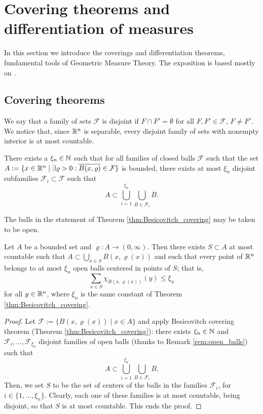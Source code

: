 \section{Covering theorems and differentiation of measures}

In this section we introduce the coverings and differentiation theorems, fundamental tools of Geometric Measure Theory. The exposition is based mostly on \cite[Chapter 2]{AFP}.

\subsection{Covering theorems}
We say that a family of sets $\mathcal{F}$ is disjoint if $F \cap F' = \emptyset$ for
all $F,F' \in \mathcal{F}$, $F \neq F'$.
We notice that, since $\mathbb{R}^{n}$ is separable, every disjoint family of sets with nonempty interior is at most countable.

\begin{theorem} \label{thm:Besicovitch_covering}
There exists a $\xi_n \in \mathbb{N}$ such that for all families of closed balls
$\mathcal{F}$ such that the set 
$A: = \{ x \in \mathbb{R}^n \mid \exists \varrho > 0 : \overline{B(x,\varrho)} \in
\mathcal{F}\}$ is bounded, there exists at most $\xi_n$ disjoint subfamilies
$\mathcal{F}_i \subset \mathcal{F}$ such that 
\[
A \subset \bigcup_{i=1}^{\xi_n} \bigcup_{\overline{B} \in \mathcal{F}_i}
\overline{B}.
\]
\end{theorem}

\begin{remark} \label{rem:open_balls}
The balls in the statement of Theorem \ref{thm:Besicovitch_covering} may be taken to be open.
\end{remark}

\begin{theorem} \label{thm:Besicovitch_covering_1}
Let $A$ be a bounded set and $\varrho : A \to (0,\infty)$. Then there exists $S
\subset A$ at most countable such that 
\(
A \subset \bigcup_{x\in S} B(x,\varrho(x)) 
\)
and such that every point of $\mathbb{R}^{n}$ belongs to at most $\xi_{n}$ open balls centered in points of $S$; that is,
\[
\sum_{x \in S} \chi_{B(x,\varrho(x))}(y) \leq \xi_n
\]
for all $y \in \mathbb{R}^n$, where $\xi_{n}$ is the same constant of Theorem \ref{thm:Besicovitch_covering}.
\end{theorem}
\begin{proof}
Let $\mathcal{F} := \{B(x,\varrho(x)) \mid x \in A\}$ and apply Besicovitch covering theorem (Theorem \ref{thm:Besicovitch_covering}): there exists $\xi_{n} \in \mathbb{N}$ and $\mathcal{F}_{i}, \dots, \mathcal{F}_{\xi_{n}}$ disjoint families of open balls (thanks to Remark \ref{rem:open_balls}) such that
\begin{equation*}
A \subset \bigcup_{i = 1}^{\xi_{n}} \bigcup_{B \in \mathcal{F}_{i}} B.
\end{equation*} 
Then, we set $S$ to be the set of centers of the balls in the families $\mathcal{F}_{i}$, for $i \in \{1, \dots, \xi_{n}\}$. Clearly, each one of these families is at most countable, being disjoint, so that $S$ is at most countable. This ends the proof.
\end{proof}


